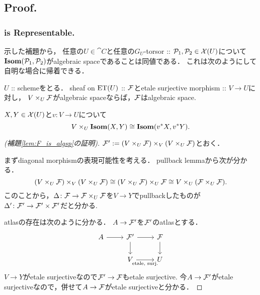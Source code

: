 \subsection{Proof.}
\subsubsection{ is Representable.}
示した補題から，
任意の$U \in \cat{C}$と任意の$G_U$-torsor :: $\mathcal{P}_1, \mathcal{P}_2 \in \mathcal{X}(U)$について
$\mathbf{Isom}(\mathcal{P}_1, \mathcal{P}_2)$がalgebraic spaceであることは同値である．
これは次のようにして自明な場合に帰着できる．

\begin{Lemma}\label{lem:F_is_algsp}
    $U$ :: schemeをとる．
    sheaf on $\mathrm{ET}(U)$ :: $\mathcal{F}$とetale surjective morphism :: $V \to U$に対し，
    $V \times_{U} \mathcal{F}$がalgebraic spaceならば，$\mathcal{F}$はalgebraic space.
\end{Lemma}

\begin{Lemma}\label{lem:UIsom}
    $X, Y \in \mathcal{X}(U)$と$v \colon V \to U$について
    \[ V \times_{U} \mathbf{Isom}(X, Y) \cong \mathbf{Isom}(v^*X, v^*Y). \]
\end{Lemma}

\begin{proof}[(補題\ref{lem:F_is_algsp}の証明)]
    $\mathcal{F}':=(V \times_{U} \mathcal{F}) \times_{V} (V \times_{U} \mathcal{F})$とおく．

    まずdiagonal morphismの表現可能性を考える．
    pullback lemmaから次が分かる．
    \[
        (V \times_{U} \mathcal{F}) \times_{V} (V \times_{U} \mathcal{F})
        \cong (V \times_{U} \mathcal{F}) \times_{U} \mathcal{F}
        \cong V \times_{U} (\mathcal{F} \times_{U} \mathcal{F}).
    \]
    このことから，$\Delta \colon \mathcal{F} \to \mathcal{F} \times_{U} \mathcal{F}$を$V \to Y$でpullbackしたものが
    $\Delta' \colon \mathcal{F}' \to \mathcal{F}' \times \mathcal{F}'$だと分かる.

    atlasの存在は次のように分かる．
    $A \to \mathcal{F}'$を$\mathcal{F}'$のatlasとする．
    \[
    \begin{tikzcd}
        A \ar[r]& \shF' \ar[r]\ar[d]& \shF \ar[d]\\
        {} & V \ar[r, "\text{etale, surj.}"']& U
    \end{tikzcd}
    \]
    $V \to Y$がetale surjectiveなので$\mathcal{F}' \to \mathcal{F}$もetale surjective.
    今$A \to \mathcal{F}'$がetale surjectiveなので，併せて$A \to \mathcal{F}$がetale surjectiveと分かる．
\end{proof}

